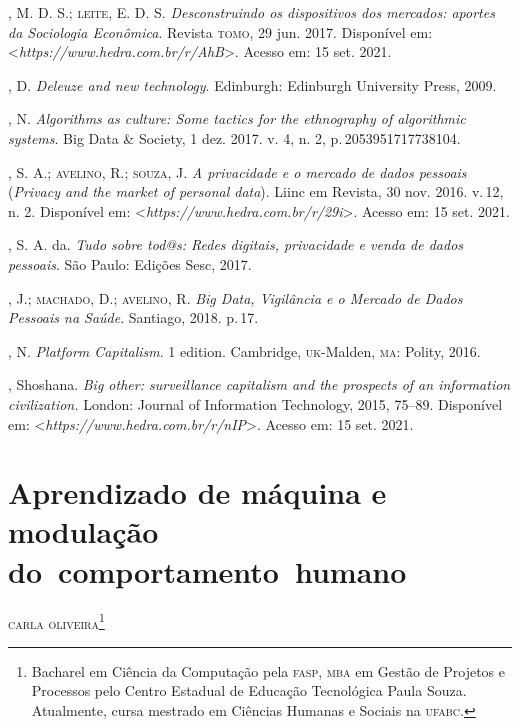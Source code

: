 \begin{bibliohedra}
, M. D. S.; \textsc{leite}, E. D. S. \emph{Desconstruindo os
dispositivos dos mercados: aportes da Sociologia Econômica}. Revista
\textsc{tomo}, 29 jun. 2017. Disponível em: \textless{}\emph{https://www.hedra.com.br/r/AhB}\textgreater{}. Acesso em: 15 set. 2021.

, D. \emph{Deleuze and new technology}. Edinburgh: Edinburgh
University Press, 2009.

, N. \emph{Algorithms as culture: Some tactics for the
ethnography of algorithmic systems}. Big Data \& Society, 1 dez. 2017. v.
4, n. 2, p.\,2053951717738104.

, S. A.; \textsc{avelino}, R.; \textsc{souza}, J. \emph{A privacidade e o
mercado de dados pessoais} (\emph{Privacy and the market of personal
data}). Liinc em Revista, 30 nov. 2016. v.\,12, n. 2. Disponível em:
\textless{}\emph{https://www.hedra.com.br/r/29i}\textgreater{}. Acesso em: 15 set. 2021.

, S. A. da. \emph{Tudo sobre tod@s: Redes digitais,
privacidade e venda de dados pessoais}. São Paulo: Edições Sesc, 2017.

, J.; \textsc{machado}, D.; \textsc{avelino}, R. \emph{Big Data, Vigilância e o
Mercado de Dados Pessoais na Saúde}. Santiago, 2018. p.\,17.

, N. \emph{Platform Capitalism}. 1 edition. Cambridge, \textsc{uk}-Malden,
\textsc{ma}: Polity, 2016.

, Shoshana. \emph{Big other: surveillance capitalism and the
prospects of an information civilization.} London: Journal of
Information Technology, 2015, 75--89. Disponível em: \textless{}\emph{https://www.hedra.com.br/r/nIP}\textgreater{}. Acesso em: 15 set. 2021.
\end{bibliohedra}


\chapter{Aprendizado de máquina e modulação do~comportamento~humano}


\begin{flushright}
\textsc{carla oliveira\footnote{Bacharel em Ciência da Computação pela \textsc{fasp}, \textsc{mba} em Gestão de Projetos e Processos pelo Centro Estadual de Educação Tecnológica Paula Souza. Atualmente, cursa mestrado em Ciências Humanas e Sociais na \textsc{ufabc}.}}
\end{flushright}

